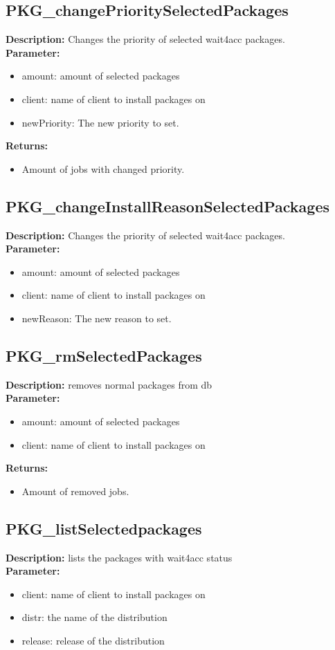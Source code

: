 \subsection{PKG\_changePrioritySelectedPackages}
\textbf{Description:} Changes the priority of selected wait4acc packages.\\
\textbf{Parameter:}
\begin{itemize}
\item amount: amount of selected packages
\item client: name of client to install packages on
\item newPriority: The new priority to set.
\end{itemize}
\textbf{Returns:}
\begin{itemize}
\item Amount of jobs with changed priority.
\end{itemize}

\subsection{PKG\_changeInstallReasonSelectedPackages}
\textbf{Description:} Changes the priority of selected wait4acc packages.\\
\textbf{Parameter:}
\begin{itemize}
\item amount: amount of selected packages
\item client: name of client to install packages on
\item newReason: The new reason to set.
\end{itemize}

\subsection{PKG\_rmSelectedPackages}
\textbf{Description:} removes normal packages from db\\
\textbf{Parameter:}
\begin{itemize}
\item amount: amount of selected packages
\item client: name of client to install packages on
\end{itemize}
\textbf{Returns:}
\begin{itemize}
\item Amount of removed jobs.
\end{itemize}

\subsection{PKG\_listSelectedpackages}
\textbf{Description:} lists the packages with wait4acc status\\
\textbf{Parameter:}
\begin{itemize}
\item client: name of client to install packages on
\item distr: the name of the distribution
\item release: release of the distribution
\end{itemize}


